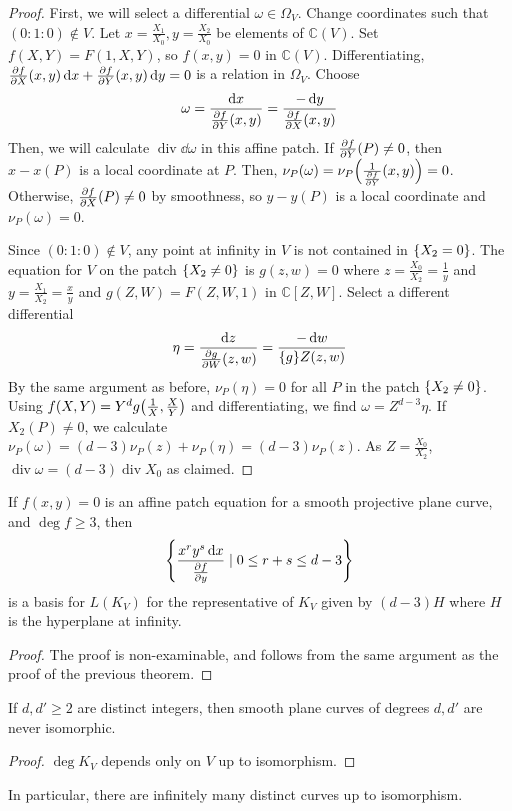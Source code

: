 \begin{proof}
    First, we will select a differential \( \omega \in \Omega_V \).
    Change coordinates such that \( (0 : 1 : 0) \not\in V \).
    Let \( x = \frac{X_1}{X_0}, y = \frac{X_2}{X_0} \) be elements of \( \mathbb C(V) \).
    Set \( f(X,Y) = F(1,X,Y) \), so \( f(x,y) = 0 \) in \( \mathbb C(V) \).
    Differentiating, \( \pdv{f}{X}\qty(x,y) \dd{x} + \pdv{f}{Y}\qty(x,y) \dd{y} = 0 \) is a relation in \( \Omega_V \).
    Choose
    \[ \omega = \frac{\dd{x}}{\pdv{f}{Y}\qty(x,y)} = \frac{-\dd{y}}{\pdv{f}{X}\qty(x,y)} \]
    Then, we will calculate \( \operatorname{div}\dd{\omega} \) in this affine patch.
    If \( \pdv{f}{Y}\qty(P) \neq 0 \), then \( x - x(P) \) is a local coordinate at \( P \).
    Then, \( \nu_P(\omega) = \nu_P\qty(\frac{1}{\pdv{f}{Y}}\qty(x,y)) = 0 \).
    Otherwise, \( \pdv{f}{X}\qty(P) \neq 0 \) by smoothness, so \( y - y(P) \) is a local coordinate and \( \nu_P(\omega) = 0 \).

    Since \( (0 : 1 : 0) \not\in V \), any point at infinity in \( V \) is not contained in \( \qty{X_2 = 0} \).
    The equation for \( V \) on the patch \( \qty{X_2 \neq 0} \) is \( g(z,w) = 0 \) where \( z = \frac{X_0}{X_2} = \frac{1}{y} \) and \( y = \frac{X_1}{X_2} = \frac{x}{y} \) and \( g(Z,W) = F(Z,W,1) \) in \( \mathbb C[Z,W] \).
    Select a different differential
    \[ \eta = \frac{\dd{z}}{\pdv{g}{W}\qty(z,w)} = \frac{-\dd{w}}{\qty{g}{Z}\qty(z,w)} \]
    By the same argument as before, \( \nu_P(\eta) = 0 \) for all \( P \) in the patch \( \qty{X_2 \neq 0} \).
    Using \( f(X,Y) = Y^d g\qty(\frac{1}{X}, \frac{X}{Y}) \) and differentiating, we find \( \omega = Z^{d-3} \eta \).
    If \( X_2(P) \neq 0 \), we calculate \( \nu_P(\omega) = (d-3)\nu_P(z) + \nu_P(\eta) = (d-3)\nu_P(z) \).
    As \( Z = \frac{X_0}{X_2} \), \( \operatorname{div} \omega = (d-3) \operatorname{div} X_0 \) as claimed.
\end{proof}
\begin{proposition}
    If \( f(x,y) = 0 \) is an affine patch equation for a smooth projective plane curve, and \( \deg f \geq 3 \), then
    \[ \qty{\frac{x^r y^s \dd{x}}{\pdv{f}{y}} \mid 0 \leq r + s \leq d - 3} \]
    is a basis for \( L(K_V) \) for the representative of \( K_V \) given by \( (d-3)H \) where \( H \) is the hyperplane at infinity.
\end{proposition}
\begin{proof}
    The proof is non-examinable, and follows from the same argument as the proof of the previous theorem.
\end{proof}
\begin{corollary}
    If \( d, d' \geq 2 \) are distinct integers, then smooth plane curves of degrees \( d, d' \) are never isomorphic.
\end{corollary}
\begin{proof}
    \( \deg K_V \) depends only on \( V \) up to isomorphism.
\end{proof}
In particular, there are infinitely many distinct curves up to isomorphism.

